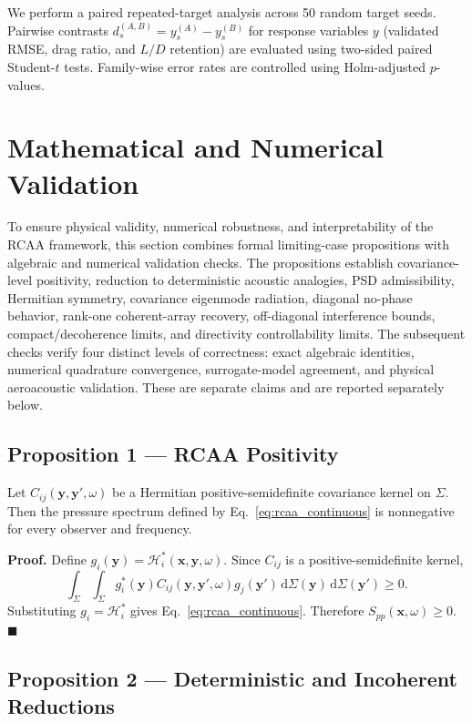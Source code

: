 \documentclass[11pt]{article}
\newcommand{\dd}{\,\mathrm{d}}
\newcommand{\vect}[1]{\bm{#1}}
\begin{document}
We perform a paired repeated-target analysis across 50 random target seeds. Pairwise contrasts $d_s^{(A,B)} = y_s^{(A)} - y_s^{(B)}$ for response variables $y$ (validated RMSE, drag ratio, and $L/D$ retention) are evaluated using two-sided paired Student-$t$ tests. Family-wise error rates are controlled using Holm-adjusted $p$-values.

\section{Mathematical and Numerical Validation}

To ensure physical validity, numerical robustness, and interpretability of the RCAA framework, this section combines formal limiting-case propositions with algebraic and numerical validation checks. The propositions establish covariance-level positivity, reduction to deterministic acoustic analogies, PSD admissibility, Hermitian symmetry, covariance eigenmode radiation, diagonal no-phase behavior, rank-one coherent-array recovery, off-diagonal interference bounds, compact/decoherence limits, and directivity controllability limits. The subsequent checks verify four distinct levels of correctness: exact algebraic identities, numerical quadrature convergence, surrogate-model agreement, and physical aeroacoustic validation. These are separate claims and are reported separately below.

\subsection{Proposition 1 --- RCAA Positivity}

Let $C_{ij}(\vect{y},\vect{y}',\omega)$ be a Hermitian positive-semidefinite covariance kernel on $\Sigma$. Then the pressure spectrum defined by Eq.~\ref{eq:rcaa_continuous} is nonnegative for every observer and frequency.

\textbf{Proof.}
Define $g_i(\vect{y})=\mathcal H_i^*(\vect{x},\vect{y},\omega)$. Since $C_{ij}$ is a positive-semidefinite kernel,
\begin{equation}
    \int_{\Sigma}\int_{\Sigma}
    g_i^*(\vect{y})
    C_{ij}(\vect{y},\vect{y}',\omega)
    g_j(\vect{y}')
    \dd\Sigma(\vect{y})
    \dd\Sigma(\vect{y}')
    \ge 0 .
\end{equation}
Substituting $g_i=\mathcal H_i^*$ gives Eq.~\ref{eq:rcaa_continuous}. Therefore $S_{pp}(\vect{x},\omega)\ge0$. $\blacksquare$

\subsection{Proposition 2 --- Deterministic and Incoherent Reductions}
\end{document}
